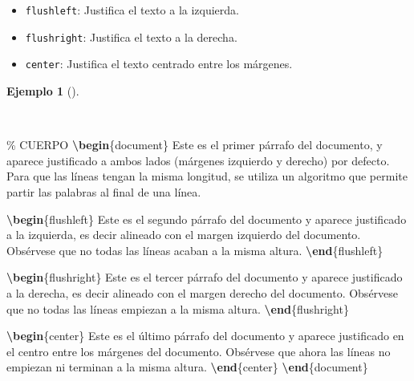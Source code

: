 \documentclass[
  spanish,
  a4paper,
]{scrreport}
\newenvironment{Shaded}{\begin{snugshade}}{\end{snugshade}}
\newcommand{\CommentTok}[1]{\textcolor[rgb]{0.37,0.37,0.37}{#1}}
\newcommand{\ExtensionTok}[1]{\textcolor[rgb]{0.00,0.23,0.31}{#1}}
\newcommand{\KeywordTok}[1]{\textcolor[rgb]{0.00,0.23,0.31}{\textbf{#1}}}
\newcommand{\NormalTok}[1]{\textcolor[rgb]{0.00,0.23,0.31}{#1}}
\providecommand{\tightlist}{%
  \setlength{\itemsep}{0pt}\setlength{\parskip}{0pt}}
\theoremstyle{definition}
\newtheorem{example}{Ejemplo}[chapter]
\theoremstyle{remark}
\begin{document}
\begin{itemize}
\tightlist
\item
  \texttt{flushleft}: Justifica el texto a la izquierda.
\item
  \texttt{flushright}: Justifica el texto a la derecha.
\item
  \texttt{center}: Justifica el texto centrado entre los márgenes.
\end{itemize}

\begin{example}[]\protect\hypertarget{exm-justificacion}{}\label{exm-justificacion}

~

\begin{Shaded}
\begin{Highlighting}[]
\CommentTok{\% CUERPO}
\KeywordTok{\textbackslash{}begin}\NormalTok{\{}\ExtensionTok{document}\NormalTok{\}}
\NormalTok{Este es el primer párrafo del documento, y aparece justificado a ambos lados}
\NormalTok{(márgenes izquierdo y derecho) por defecto. Para que las líneas tengan la }
\NormalTok{misma longitud, se utiliza un algoritmo que permite partir las palabras al }
\NormalTok{final de una línea.}

\KeywordTok{\textbackslash{}begin}\NormalTok{\{}\ExtensionTok{flushleft}\NormalTok{\}}
\NormalTok{Este es el segundo párrafo del documento y aparece justificado a la }
\NormalTok{izquierda, es decir alineado con el margen izquierdo del documento. }
\NormalTok{Obsérvese que no todas las líneas acaban a la misma altura.}
\KeywordTok{\textbackslash{}end}\NormalTok{\{}\ExtensionTok{flushleft}\NormalTok{\}}

\KeywordTok{\textbackslash{}begin}\NormalTok{\{}\ExtensionTok{flushright}\NormalTok{\}}
\NormalTok{Este es el tercer párrafo del documento y aparece justificado a la derecha,}
\NormalTok{es decir alineado con el margen derecho del documento. Obsérvese que no }
\NormalTok{todas las líneas empiezan a la misma altura.}
\KeywordTok{\textbackslash{}end}\NormalTok{\{}\ExtensionTok{flushright}\NormalTok{\}}

\KeywordTok{\textbackslash{}begin}\NormalTok{\{}\ExtensionTok{center}\NormalTok{\}}
\NormalTok{Este es el último párrafo del documento y aparece justificado en el centro}
\NormalTok{entre los márgenes del documento. Obsérvese que ahora las líneas no }
\NormalTok{empiezan ni terminan a la misma altura. }
\KeywordTok{\textbackslash{}end}\NormalTok{\{}\ExtensionTok{center}\NormalTok{\}}
\KeywordTok{\textbackslash{}end}\NormalTok{\{}\ExtensionTok{document}\NormalTok{\}}
\end{Highlighting}
\end{Shaded}


\end{example}
\end{document}
